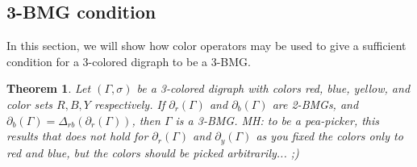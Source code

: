 \documentclass[final,3p,times]{elsarticle}
\newtheorem{theorem}{Theorem}[section]
\newcommand{\TODO}[1]{\begingroup\color{red}#1\endgroup}
\begin{document}
\subsection{3-BMG condition}
\label{sec:3-BMG condition}
In this section, we will show how color operators may be used to give a sufficient condition for a 3-colored digraph to be a 3-BMG.

\begin{theorem}\label{thm:sufficient_condition}
Let $(\Gamma,\sigma)$ be a 3-colored digraph with colors red, blue, yellow, and color sets $R,B,Y$ respectively. If $\partial_r(\Gamma)$ and $\partial_b(\Gamma)$ are 2-BMGs, and $\partial_b(\Gamma)=\Delta_{rb}(\partial_r(\Gamma))$, then $\Gamma$ is a 3-BMG. \TODO{MH: to be a pea-picker, this results that does not hold
for  $\partial_r(\Gamma)$ and $\partial_y(\Gamma)$ as you fixed the colors only to red and blue, but the colors should be picked arbitrarily... ;)  }
\end{theorem}
\end{document}
